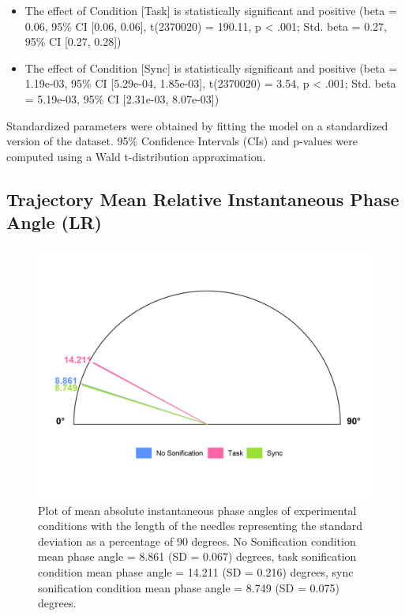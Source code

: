 \documentclass[10pt,a4paper,onecolumn]{article}
\providecommand{\tightlist}{%
  \setlength{\itemsep}{0pt}\setlength{\parskip}{0pt}}
\begin{document}
\begin{itemize}
\tightlist
\item
  The effect of Condition {[}Task{]} is statistically significant and positive (beta = 0.06, 95\% CI {[}0.06, 0.06{]}, t(2370020) = 190.11, p \textless{} .001; Std. beta = 0.27, 95\% CI {[}0.27, 0.28{]})
\item
  The effect of Condition {[}Sync{]} is statistically significant and positive (beta = 1.19e-03, 95\% CI {[}5.29e-04, 1.85e-03{]}, t(2370020) = 3.54, p \textless{} .001; Std. beta = 5.19e-03, 95\% CI {[}2.31e-03, 8.07e-03{]})
\end{itemize}

Standardized parameters were obtained by fitting the model on a standardized version of the dataset. 95\% Confidence Intervals (CIs) and p-values were computed using a Wald t-distribution approximation.

\hypertarget{trajectory-mean-relative-instantaneous-phase-angle-lr-1}{%
\subsection{Trajectory Mean Relative Instantaneous Phase Angle (LR)}\label{trajectory-mean-relative-instantaneous-phase-angle-lr-1}}

\begin{figure}[h]

{\centering \includegraphics[width=1\linewidth]{figures/mean_condition_phase_angles_mean_sd} 

}

\caption{Plot of mean absolute instantaneous phase angles of experimental conditions with the length of the needles representing the standard deviation as a percentage of 90 degrees. No Sonification condition mean phase angle = 8.861 (SD = 0.067) degrees, task sonification condition mean phase angle = 14.211 (SD = 0.216) degrees, sync sonification condition mean phase angle = 8.749 (SD = 0.075) degrees.}\label{fig:mean-instantaneous-phase-angle-circular-plot}
\end{figure}
\end{document}
